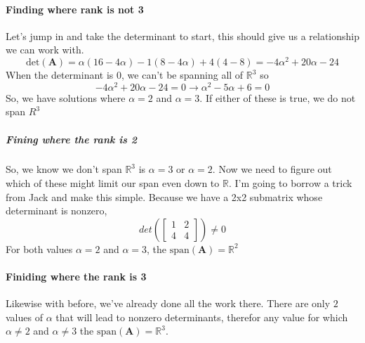 \documentclass{article}
\begin{document}
        \paragraph{Finding where rank is not 3}
            Let's jump in and take the determinant to start, this should give us a relationship we can work with.
            \[
                \text{det}(\mathbf{A})=\alpha(16-4\alpha)-1(8-4\alpha)+4(4-8)=-4\alpha^2+20\alpha-24
            \]
            When the determinant is $0$, we can't be spanning all of $\mathbb{R}^3$ so
            \[
                -4\alpha^2+20\alpha-24=0
                \rightarrow
                \alpha^2-5\alpha+6=0
            \]
            So, we have solutions where $\alpha=2$ and $\alpha=3$. If either of these is true, we do not span $R^3$
            \subparagraph{Fining where the rank is 2}
                So, we know we don't span $\mathbb{R}^3$ is $\alpha=3$ or $\alpha=2$. Now we need to figure out which
                of these might limit our span even down to $\mathbb{R}$. I'm going to borrow a trick from Jack and make this simple.
                Because we have a 2x2 submatrix whose determinant is nonzero, $$det(\begin{bmatrix}1&2\\4&4\end{bmatrix})\ne0$$
                For both values $\alpha=2$ and $\alpha=3$, the $\text{span}(\mathbf{A})=\mathbb{R}^2$
        \paragraph{Finiding where the rank is 3}
            Likewise with before, we've already done all the work there. There are only $2$ values of $\alpha$
            that will lead to nonzero determinants, therefor any value for which $\alpha \ne 2$ and $\alpha \ne 3$
            the $\text{span}(\mathbf{A})=\mathbb{R}^3$.
\end{document}
